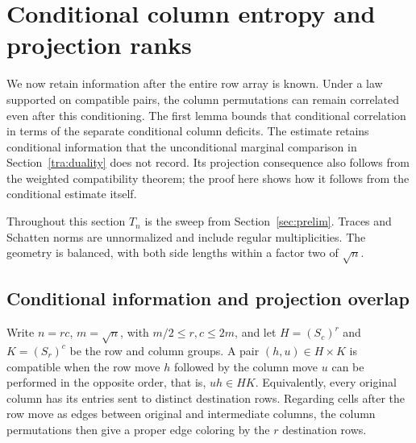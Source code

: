 \section{Conditional column entropy and projection ranks}\label{tra:conditional}

We now retain information after the entire row array is known. Under a
law supported on compatible pairs, the column permutations can remain
correlated even after this conditioning. The first lemma bounds that
conditional correlation in terms of the separate conditional column
deficits. The estimate retains conditional information that the unconditional
marginal comparison in Section~\ref{tra:duality} does not record. Its projection consequence
also follows from the weighted compatibility theorem; the proof here
shows how it follows from the conditional estimate itself.

Throughout this section $T_n$ is the sweep from Section~\ref{sec:prelim}.
Traces and Schatten norms are unnormalized and include regular
multiplicities. The geometry is balanced, with both side lengths within
a factor two of $\sqrt n$.

\subsection{Conditional information and projection overlap}\label{tra:conditional:compatibility}
Write $n=rc$, $m=\sqrt n$, with $m/2\le r,c\le2m$, and let
$H=(S_c)^r$ and $K=(S_r)^c$ be the row and column groups.
A pair $(h,u)\in H\times K$ is compatible when the row move $h$
followed by the column move $u$ can be performed in the opposite order,
that is, $uh\in HK$. Equivalently, every original column has its
entries sent to distinct destination rows. Regarding cells after the
row move as edges between original and intermediate columns, the
column permutations then give a proper edge coloring by the $r$
destination rows.

